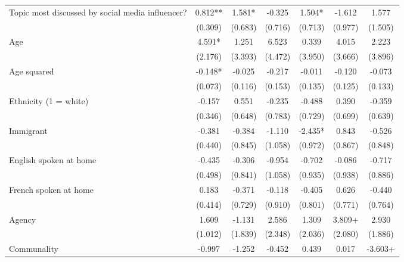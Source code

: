 \documentclass[
  letterpaper,
  DIV=11,
  numbers=noendperiod]{scrreprt}
\begin{document}
\begin{table}
\begin{tabular}[t]{lcccccc}
\hspace{1em}Topic most discussed by social media influencer? & 0.812** & 1.581* & -0.325 & 1.504* & -1.612 & 1.577\\
\hspace{1em} & (0.309) & (0.683) & (0.716) & (0.713) & (0.977) & (1.505)\\
\hspace{1em}Age & 4.591* & 1.251 & 6.523 & 0.339 & 4.015 & 2.223\\
\hspace{1em} & (2.176) & (3.393) & (4.472) & (3.950) & (3.666) & (3.896)\\
\hspace{1em}Age squared & -0.148* & -0.025 & -0.217 & -0.011 & -0.120 & -0.073\\
\hspace{1em} & (0.073) & (0.116) & (0.153) & (0.135) & (0.125) & (0.133)\\
\hspace{1em}Ethnicity (1 = white) & -0.157 & 0.551 & -0.235 & -0.488 & 0.390 & -0.359\\
\hspace{1em} & (0.346) & (0.648) & (0.783) & (0.729) & (0.699) & (0.639)\\
\hspace{1em}Immigrant & -0.381 & -0.384 & -1.110 & -2.435* & 0.843 & -0.526\\
\hspace{1em} & (0.440) & (0.845) & (1.058) & (0.972) & (0.867) & (0.848)\\
\hspace{1em}English spoken at home & -0.435 & -0.306 & -0.954 & -0.702 & -0.086 & -0.717\\
\hspace{1em} & (0.498) & (0.841) & (1.058) & (0.935) & (0.938) & (0.886)\\
\hspace{1em}French spoken at home & 0.183 & -0.371 & -0.118 & -0.405 & 0.626 & -0.440\\
\hspace{1em} & (0.414) & (0.729) & (0.910) & (0.801) & (0.771) & (0.764)\\
\hspace{1em}Agency & 1.609 & -1.131 & 2.586 & 1.309 & 3.809+ & 2.930\\
\hspace{1em} & (1.012) & (1.839) & (2.348) & (2.036) & (2.080) & (1.886)\\
\hspace{1em}Communality & -0.997 & -1.252 & -0.452 & 0.439 & 0.017 & -3.603+\\

\end{tabular}
\end{table}
\end{document}
